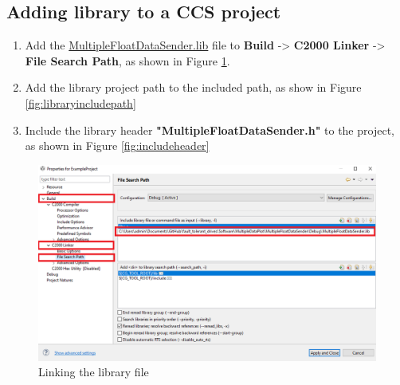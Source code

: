 \documentclass{article}
\begin{document}
\subsection{Adding library to a CCS project}
\label{subsection:addinglibrary}
\begin{enumerate}
	\item Add the \href{https://github.com/hakansrc/fault_tolerant_drives/blob/master/Software/MultipleDataPlot/MultipleFloatDataSender/Debug/MultipleFloatDataSender.lib}{MultipleFloatDataSender.lib} file to \textbf{Build} -> \textbf{C2000 Linker} -> \textbf{File Search Path}, as shown in Figure \ref{fig:dotlibfile}.
	\item Add the library project path to the included path, as show in Figure \ref{fig:libraryincludepath}
	\item Include the library header \textbf{"MultipleFloatDataSender.h"} to the project, as shown in Figure \ref{fig:includeheader}
\end{enumerate}
\begin{figure}[H]
	\centering
	\includegraphics[scale=0.5]{Figures/dotlibfile.png}
	\caption{Linking the library file}
	\label{fig:dotlibfile}
\end{figure}
\end{document}
